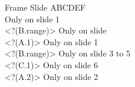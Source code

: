 \documentclass {beamer}
\begin{document}
\BeanovesOn
\BeanovesDebugOn
{}
\begin{frame}
  {\Large Frame \insertframenumber}
  {\Large Slide \insertslidenumber}
ABCDEF
\\
 {Only on slide 1}\\
\visible<?(B.range)> {Only on slide }\\
\visible<?(A.1)> {Only on slide 1}\\
\visible<?(B.range)> {Only on slide 3 to 5}\\
\visible<?(C.1)> {Only on slide 6}\\
\visible<?(A.2)> {Only on slide 2}\\
\\
\end{frame}
\end{document}
